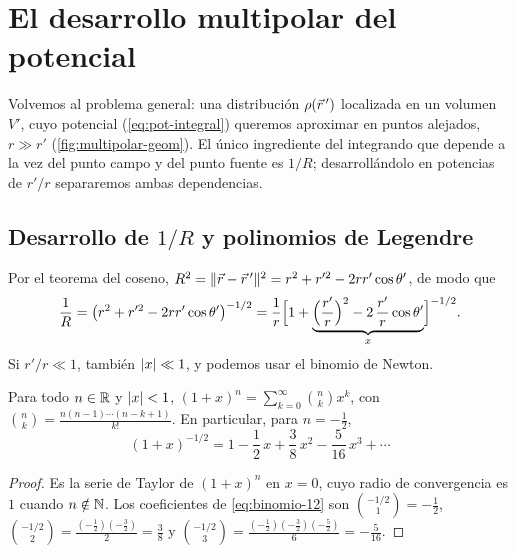 \section{El desarrollo multipolar del potencial}\label{sec:multipolar}
Volvemos al problema general: una distribución $\rho(\vec{r}\,')$ localizada en un volumen $V'$, cuyo potencial (\cref{eq:pot-integral}) queremos aproximar en
puntos alejados, $r\gg r'$ (\cref{fig:multipolar-geom}). El único ingrediente del integrando que depende a la vez del punto campo y del punto
fuente es $1/R$; desarrollándolo en potencias de $r'/r$ separaremos ambas dependencias.



\subsection{Desarrollo de \texorpdfstring{$1/R$}{1/R} y polinomios de Legendre}\label{sec:desarrollo-1R}
Por el teorema del coseno, $R^{2}=\lVert \vec{r}-\vec{r}\,'\rVert^{2}=r^{2}+r'^{2}-2rr'\cos\theta'$, de modo que
\begin{equation}\label{eq:1R-coseno}
  \frac{1}{R}=\bigl(r^{2}+r'^{2}-2rr'\cos\theta'\bigr)^{-1/2}
  =\frac{1}{r}\Bigl[1+\underbrace{\Bigl(\frac{r'}{r}\Bigr)^{2}-2\,\frac{r'}{r}\cos\theta'}_{x}\Bigr]^{-1/2}.
\end{equation}
Si $r'/r\ll1$, también $\lvert x\rvert\ll1$, y podemos usar el binomio de Newton.

\begin{lema}\label{lem:binomio}
Para todo $n\in\mathbb{R}$ y $\lvert x\rvert<1$, $(1+x)^{n}=\sum_{k=0}^{\infty}\binom{n}{k}x^{k}$, con
$\binom{n}{k}=\frac{n(n-1)\cdots(n-k+1)}{k!}$. En particular, para $n=-\frac12$,
\begin{equation}\label{eq:binomio-12}
  (1+x)^{-1/2}=1-\frac{1}{2}\,x+\frac{3}{8}\,x^{2}-\frac{5}{16}\,x^{3}+\cdots
\end{equation}
\end{lema}
\begin{proof}
Es la serie de Taylor de $(1+x)^{n}$ en $x=0$, cuyo radio de convergencia es $1$ cuando $n\notin\mathbb{N}$. Los coeficientes de \cref{eq:binomio-12} son
$\binom{-1/2}{1}=-\frac12$, $\binom{-1/2}{2}=\frac{(-\frac12)(-\frac32)}{2}=\frac38$ y $\binom{-1/2}{3}=\frac{(-\frac12)(-\frac32)(-\frac52)}{6}=-\frac{5}{16}$.
\end{proof}

